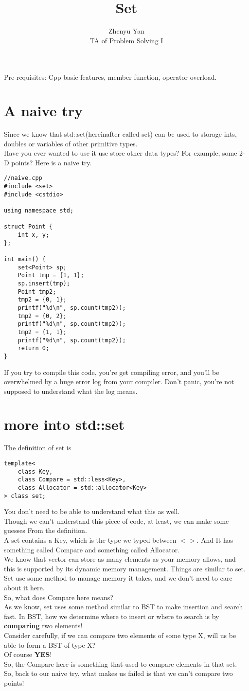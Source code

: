 \documentclass{article}
\title{Set}
\author{Zhenyu Yan\\TA of Problem Solving I}
\date{}
\begin{document}
\maketitle
Pre-requisites: Cpp basic features, member function, operator overload.
\section{A naive try}
Since we know that std::set(hereinafter called set) can be used to storage ints, doubles or variables of other primitive types.\\
Have you ever wanted to use it use store other data types? For example, some 2-D points?
Here is a naive try.
\begin{lstlisting}
//naive.cpp
#include <set>
#include <cstdio>

using namespace std;

struct Point {
    int x, y;
};

int main() {
    set<Point> sp;
    Point tmp = {1, 1};
    sp.insert(tmp);
    Point tmp2;
    tmp2 = {0, 1};
    printf("%d\n", sp.count(tmp2));
    tmp2 = {0, 2};
    printf("%d\n", sp.count(tmp2));
    tmp2 = {1, 1};
    printf("%d\n", sp.count(tmp2));
    return 0;
}
\end{lstlisting}
If you try to compile this code, you're get compiling error, and you'll be overwhelmed by a huge error log from your compiler. Don't panic, you're not supposed to understand what the log means.
\newpage
\section{more into std::set}
The definition of set is
\begin{lstlisting}
template<
    class Key,
    class Compare = std::less<Key>,
    class Allocator = std::allocator<Key>
> class set; 
\end{lstlisting}
You don't need to be able to understand what this as well.\\
Though we can't understand this piece of code, at least, we can make some guesses From the definition.\\
A set contains a Key, which is the type we typed between $<>$. And It has something called Compare and something called Allocator.\\
We know that vector can store as many elements as your memory allows, and this is supported by its dynamic memory management. Things are similar to set. Set use some method to manage memory it takes, and we don't need to care about it here.\\
So, what does Compare here means?\\
As we know, set uses some method similar to BST to make insertion and search fast. In BST, how we determine where to insert or where to search is by \textbf{comparing} two elements!\\
Consider carefully, if we can compare two elements of some type X, will us be able to form a BST of type X?\\
Of course \textbf{YES}!\\
So, the Compare here is something that used to compare elements in that set.\\
So, back to our naive try, what makes us failed is that we can't compare two points!
\newpage
\end{document}
